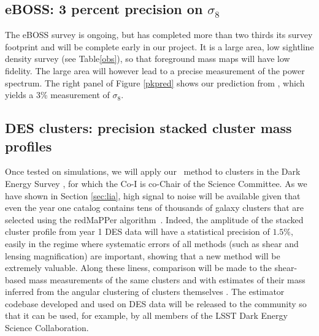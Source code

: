 \subsection{eBOSS: 3 percent precision on $\sigma_{8}$}
The eBOSS survey is ongoing, but has completed more than two thirds its survey
footprint and will be complete early in our project.
It is a large area, low sightline density survey (see Table\ref{obs}), so
that foreground mass maps will have low fidelity. The large area will
however lead to a precise measurement of the power spectrum.
The right panel of Figure \ref{pkpred} shows our prediction from 
\cite{metcalfandcroft}, which yields a 3\% measurement of $\sigma_{8}$.

\subsection{DES clusters: precision stacked cluster mass profiles}

Once tested on simulations, we will apply our
\atf\  method to clusters in the Dark Energy Survey \cite{des2016},
for which the Co-I is co-Chair of the Science Committee. 
As we have shown in Section \ref{sec:lia}, high signal to noise will be
available given that even the year one catalog contains tens of  
thousands of galaxy clusters 
that are selected using the redMaPPer algorithm~\cite{melchior2017}.
Indeed, the amplitude of the stacked cluster profile from year 1 DES data
will have a statistical precision of $1.5 \%$, easily in the 
regime where systematic errors of all methods (such as shear and
lensing magnification) are important, showing that a new method will
be extremely valuable. Along these liness, comparison will 
be made to the shear-based
mass measurements of the same clusters \cite{simet2017} and with
estimates of their mass inferred from the angular clustering
of clusters themselves \cite{baxter2016}.
The estimator codebase developed and used on DES data will
be released to the community so that it can be used, for example, by
all members of the LSST Dark Energy Science Collaboration.
